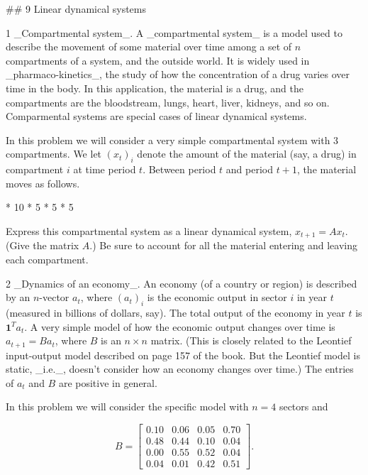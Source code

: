 

## 9 Linear dynamical systems

1 _Compartmental system_. A _compartmental system_ is a model used to describe the movement of some material over time among a set of \(n\) compartments of a system, and the outside world. It is widely used in _pharmaco-kinetics_, the study of how the concentration of a drug varies over time in the body. In this application, the material is a drug, and the compartments are the bloodstream, lungs, heart, liver, kidneys, and so on. Comparmental systems are special cases of linear dynamical systems.

In this problem we will consider a very simple compartmental system with 3 compartments. We let \((x_{t})_{i}\) denote the amount of the material (say, a drug) in compartment \(i\) at time period \(t\). Between period \(t\) and period \(t+1\), the material moves as follows.

* 10%
* 5%
* 5%
* 5%

Express this compartmental system as a linear dynamical system, \(x_{t+1}=Ax_{t}\). (Give the matrix \(A\).) Be sure to account for all the material entering and leaving each compartment.

2 _Dynamics of an economy_. An economy (of a country or region) is described by an \(n\)-vector \(a_{t}\), where \((a_{t})_{i}\) is the economic output in sector \(i\) in year \(t\) (measured in billions of dollars, say). The total output of the economy in year \(t\) is \(\mathbf{1}^{T}a_{t}\). A very simple model of how the economic output changes over time is \(a_{t+1}=Ba_{t}\), where \(B\) is an \(n\times n\) matrix. (This is closely related to the Leontief input-output model described on page 157 of the book. But the Leontief model is static, _i.e._, doesn't consider how an economy changes over time.) The entries of \(a_{t}\) and \(B\) are positive in general.

In this problem we will consider the specific model with \(n=4\) sectors and

\[B=\left[\begin{array}{cccc}0.10&0.06&0.05&0.70\\ 0.48&0.44&0.10&0.04\\ 0.00&0.55&0.52&0.04\\ 0.04&0.01&0.42&0.51\end{array}\right].\]

